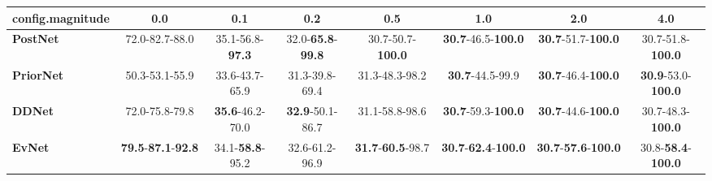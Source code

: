 \begin{tabular}{lccccccc}
\toprule
\textbf{config.magnitude} &                                        0.0 &                      0.1 &                               0.2 &                               0.5 &                                         1.0 &                                         2.0 &                                4.0 \\
\midrule
\textbf{PostNet } &                             72.0-82.7-88.0 &  35.1-56.8-\textbf{97.3} &  32.0-\textbf{65.8}-\textbf{99.8} &          30.7-50.7-\textbf{100.0} &           \textbf{30.7}-46.5-\textbf{100.0} &           \textbf{30.7}-51.7-\textbf{100.0} &           30.7-51.8-\textbf{100.0} \\
\textbf{PriorNet} &                             50.3-53.1-55.9 &           33.6-43.7-65.9 &                    31.3-39.8-69.4 &                    31.3-48.3-98.2 &                     \textbf{30.7}-44.5-99.9 &           \textbf{30.7}-46.4-\textbf{100.0} &  \textbf{30.9}-53.0-\textbf{100.0} \\
\textbf{DDNet   } &                             72.0-75.8-79.8 &  \textbf{35.6}-46.2-70.0 &           \textbf{32.9}-50.1-86.7 &                    31.1-58.8-98.6 &           \textbf{30.7}-59.3-\textbf{100.0} &           \textbf{30.7}-44.6-\textbf{100.0} &           30.7-48.3-\textbf{100.0} \\
\textbf{EvNet   } &  \textbf{79.5}-\textbf{87.1}-\textbf{92.8} &  34.1-\textbf{58.8}-95.2 &                    32.6-61.2-96.9 &  \textbf{31.7}-\textbf{60.5}-98.7 &  \textbf{30.7}-\textbf{62.4}-\textbf{100.0} &  \textbf{30.7}-\textbf{57.6}-\textbf{100.0} &  30.8-\textbf{58.4}-\textbf{100.0} \\
\bottomrule
\end{tabular}
